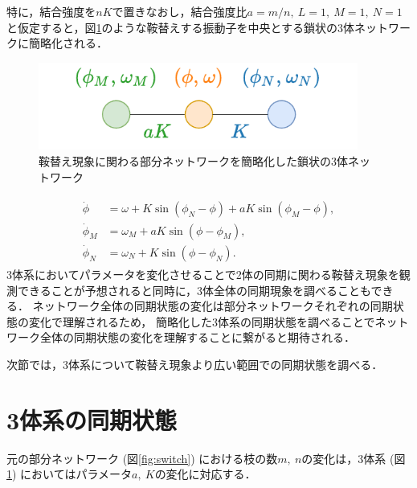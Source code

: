 \documentclass[../main]{subfiles}
\begin{document}
特に，結合強度を$nK$で置きなおし，結合強度比$a=m/n,\ L=1,\ M=1,\ N=1$と仮定すると，図\ref{fig:3body}のような鞍替えする振動子を中央とする鎖状の3体ネットワークに簡略化される．
\begin{figure}[tbp]
    \centering
    \includegraphics[width=105mm]{./images/three_obj_after.pdf}
    \centering
    \caption{鞍替え現象に関わる部分ネットワークを簡略化した鎖状の3体ネットワーク}
    \label{fig:3body}
\end{figure}
\begin{align}
    \label{eq:3body}
    \begin{split}
        \dot{\phi}&=\omega+K\sin\left( \phi_N-\phi \right)+aK\sin\left( \phi_M-\phi \right),\\
        \dot{\phi}_M&=\omega_M+aK\sin\left( \phi-\phi_M \right), \\
        \dot{\phi}_N&=\omega_N+K\sin\left( \phi-\phi_N \right).    
    \end{split}
\end{align}
3体系においてパラメータを変化させることで2体の同期に関わる鞍替え現象を観測できることが予想されると同時に，3体全体の同期現象を調べることもできる．
ネットワーク全体の同期状態の変化は部分ネットワークそれぞれの同期状態の変化で理解されるため，
簡略化した3体系の同期状態を調べることでネットワーク全体の同期状態の変化を理解することに繋がると期待される．

次節では，3体系について鞍替え現象より広い範囲での同期状態を調べる．
\section{3体系の同期状態}

元の部分ネットワーク (図\ref{fig:switch}) における枝の数$m,\ n$の変化は，3体系 (図\ref{fig:3body}) においてはパラメータ$a,\ K$の変化に対応する．
\end{document}
